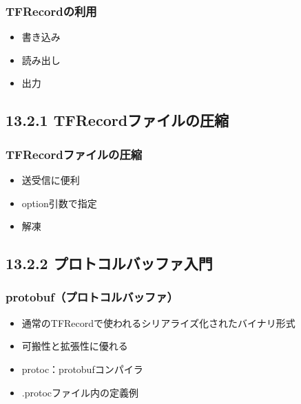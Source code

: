 \hypertarget{tfrecordux306eux5229ux7528}{%
\subsubsection{TFRecordの利用}\label{tfrecordux306eux5229ux7528}}

\begin{itemize}
\tightlist
\item
  書き込み
\item
  読み出し
\item
  出力
\end{itemize}

\hypertarget{tfrecordux30d5ux30a1ux30a4ux30ebux306eux5727ux7e2e}{%
\subsection{13.2.1
TFRecordファイルの圧縮}\label{tfrecordux30d5ux30a1ux30a4ux30ebux306eux5727ux7e2e}}

\hypertarget{tfrecordux30d5ux30a1ux30a4ux30ebux306eux5727ux7e2e-1}{%
\subsubsection{TFRecordファイルの圧縮}\label{tfrecordux30d5ux30a1ux30a4ux30ebux306eux5727ux7e2e-1}}

\begin{itemize}
\tightlist
\item
  送受信に便利
\item
  option引数で指定
\item
  解凍
\end{itemize}

\hypertarget{ux30d7ux30edux30c8ux30b3ux30ebux30d0ux30c3ux30d5ux30a1ux5165ux9580}{%
\subsection{13.2.2
プロトコルバッファ入門}\label{ux30d7ux30edux30c8ux30b3ux30ebux30d0ux30c3ux30d5ux30a1ux5165ux9580}}

\hypertarget{protobufux30d7ux30edux30c8ux30b3ux30ebux30d0ux30c3ux30d5ux30a1}{%
\subsubsection{protobuf（プロトコルバッファ）}\label{protobufux30d7ux30edux30c8ux30b3ux30ebux30d0ux30c3ux30d5ux30a1}}

\begin{itemize}
\tightlist
\item
  通常のTFRecordで使われるシリアライズ化されたバイナリ形式
\item
  可搬性と拡張性に優れる
\item
  protoc：protobufコンパイラ
\item
  .protocファイル内の定義例
\end{itemize}

